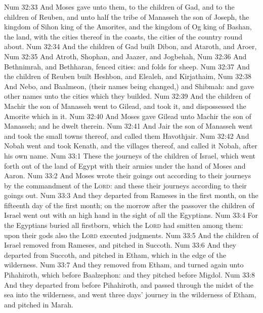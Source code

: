 \vs Num 32:33 And Moses gave unto them,  to the children of Gad, and to the children of Reuben, and unto half the tribe of Manasseh the son of Joseph, the kingdom of Sihon king of the Amorites, and the kingdom of Og king of Bashan, the land, with the cities thereof in the coasts,  the cities of the country round about.
\vs Num 32:34 And the children of Gad built Dibon, and Ataroth, and Aroer,
\vs Num 32:35 And Atroth, Shophan, and Jaazer, and Jogbehah,
\vs Num 32:36 And Bethnimrah, and Bethharan, fenced cities: and folds for sheep.
\vs Num 32:37 And the children of Reuben built Heshbon, and Elealeh, and Kirjathaim,
\vs Num 32:38 And Nebo, and Baalmeon, (their names being changed,) and Shibmah: and gave other names unto the cities which they builded.
\vs Num 32:39 And the children of Machir the son of Manasseh went to Gilead, and took it, and dispossessed the Amorite which  in it.
\vs Num 32:40 And Moses gave Gilead unto Machir the son of Manasseh; and he dwelt therein.
\vs Num 32:41 And Jair the son of Manasseh went and took the small towns thereof, and called them Havothjair.
\vs Num 32:42 And Nobah went and took Kenath, and the villages thereof, and called it Nobah, after his own name.
\vs Num 33:1 These  the journeys of the children of Israel, which went forth out of the land of Egypt with their armies under the hand of Moses and Aaron.
\vs Num 33:2 And Moses wrote their goings out according to their journeys by the commandment of the \textsc{Lord}: and these  their journeys according to their goings out.
\vs Num 33:3 And they departed from Rameses in the first month, on the fifteenth day of the first month; on the morrow after the passover the children of Israel went out with an high hand in the sight of all the Egyptians.
\vs Num 33:4 For the Egyptians buried all  firstborn, which the \textsc{Lord} had smitten among them: upon their gods also the \textsc{Lord} executed judgments.
\vs Num 33:5 And the children of Israel removed from Rameses, and pitched in Succoth.
\vs Num 33:6 And they departed from Succoth, and pitched in Etham, which  in the edge of the wilderness.
\vs Num 33:7 And they removed from Etham, and turned again unto Pihahiroth, which  before Baalzephon: and they pitched before Migdol.
\vs Num 33:8 And they departed from before Pihahiroth, and passed through the midst of the sea into the wilderness, and went three days' journey in the wilderness of Etham, and pitched in Marah.
